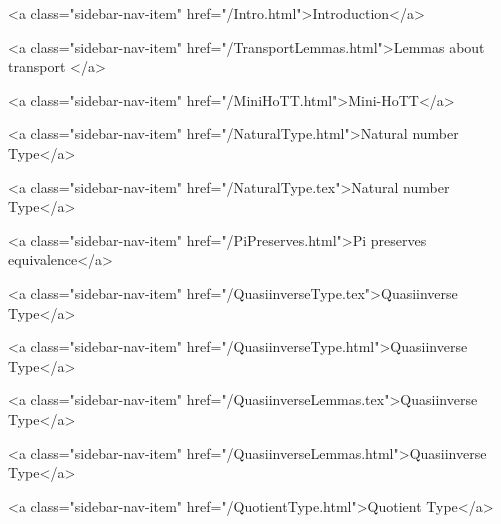       
    
      
        
          <a class="sidebar-nav-item" href="/Intro.html">Introduction</a>
        
      
    
      
        
          <a class="sidebar-nav-item" href="/TransportLemmas.html">Lemmas about transport </a>
        
      
    
      
        
          <a class="sidebar-nav-item" href="/MiniHoTT.html">Mini-HoTT</a>
        
      
    
      
        
          <a class="sidebar-nav-item" href="/NaturalType.html">Natural number Type</a>
        
      
    
      
        
          <a class="sidebar-nav-item" href="/NaturalType.tex">Natural number Type</a>
        
      
    
      
        
          <a class="sidebar-nav-item" href="/PiPreserves.html">Pi preserves equivalence</a>
        
      
    
      
        
          <a class="sidebar-nav-item" href="/QuasiinverseType.tex">Quasiinverse Type</a>
        
      
    
      
        
          <a class="sidebar-nav-item" href="/QuasiinverseType.html">Quasiinverse Type</a>
        
      
    
      
        
          <a class="sidebar-nav-item" href="/QuasiinverseLemmas.tex">Quasiinverse Type</a>
        
      
    
      
        
          <a class="sidebar-nav-item" href="/QuasiinverseLemmas.html">Quasiinverse Type</a>
        
      
    
      
        
          <a class="sidebar-nav-item" href="/QuotientType.html">Quotient Type</a>
        
